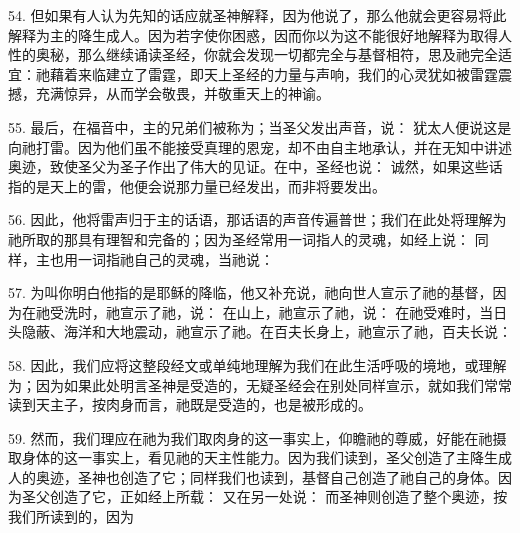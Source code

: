 54. 但如果有人认为先知的话应就圣神解释，因为他说了，那么他就会更容易将此解释为主的降生成人。因为若字使你困惑，因而你以为这不能很好地解释为取得人性的奥秘，那么继续诵读圣经，你就会发现一切都完全与基督相符，思及祂完全适宜：祂藉着来临建立了雷霆，即天上圣经的力量与声响，我们的心灵犹如被雷霆震撼，充满惊异，从而学会敬畏，并敬重天上的神谕。\par

55. 最后，在福音中，主的兄弟们被称为；当圣父发出声音，说：  犹太人便说这是向祂打雷。因为他们虽不能接受真理的恩宠，却不由自主地承认，并在无知中讲述奥迹，致使圣父为圣子作出了伟大的见证。在中，圣经也说： 诚然，如果这些话指的是天上的雷，他便会说那力量已经发出，而非将要发出。\par

56. 因此，他将雷声归于主的话语，那话语的声音传遍普世；我们在此处将理解为祂所取的那具有理智和完备的；因为圣经常用一词指人的灵魂，如经上说：  同样，主也用一词指祂自己的灵魂，当祂说： \par

57. 为叫你明白他指的是耶稣的降临，他又补充说，祂向世人宣示了祂的基督，因为在祂受洗时，祂宣示了祂，说：  在山上，祂宣示了祂，说：  在祂受难时，当日头隐蔽、海洋和大地震动，祂宣示了祂。在百夫长身上，祂宣示了祂，百夫长说： \par

58. 因此，我们应将这整段经文或单纯地理解为我们在此生活呼吸的境地，或理解为；因为如果此处明言圣神是受造的，无疑圣经会在别处同样宣示，就如我们常常读到天主子，按肉身而言，祂既是受造的，也是被形成的。\par

59. 然而，我们理应在祂为我们取肉身的这一事实上，仰瞻祂的尊威，好能在祂摄取身体的这一事实上，看见祂的天主性能力。因为我们读到，圣父创造了主降生成人的奥迹，圣神也创造了它；同样我们也读到，基督自己创造了祂自己的身体。因为圣父创造了它，正如经上所载：  又在另一处说：  而圣神则创造了整个奥迹，按我们所读到的，因为 \par

